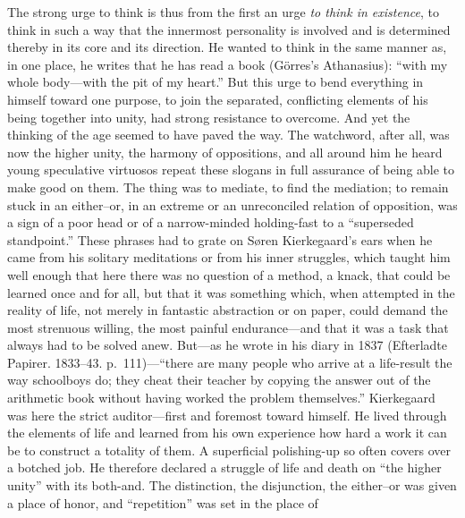 \documentclass[12pt,a4paper]{book}
\newcommand{\opage}[1]{\marginnote{\footnotesize\textit{[#1]}}}
\begin{document}
The strong urge to think is thus from the first an urge \textit{to think
in existence}, to think in such a way that the innermost personality is
involved and is determined thereby in its core and its direction. He
wanted to think in the same manner as, in one place, he writes that he
has read a book (Görres's Athanasius): ``with my whole body---with the pit
of my heart.'' But this urge to bend everything in himself toward one
purpose, to join the separated, conflicting elements of his being
together into unity, had strong resistance to overcome. And yet the
thinking of the age seemed to have paved the way. The watchword, after
all, was now the higher unity, the harmony of oppositions, and all around
him he heard young speculative virtuosos repeat these slogans in full
assurance of being able to make good on them. The thing was to mediate,
to find the mediation; to remain stuck in an either--or, in an extreme or
an unreconciled relation of opposition, was a sign of a poor head or of a
narrow-minded holding-fast to a ``superseded standpoint.'' These phrases
had to grate on Søren Kierkegaard's ears when he came from his solitary
meditations or from his inner struggles, which taught him well enough
that here there was no question of a method, a knack, that could be
learned once and for all, but that it was something which, when attempted
in the reality of life, not merely in fantastic
\opage{46}abstraction or on paper, could demand the most strenuous willing,
the most painful endurance---and that it was a task that always had to be
solved anew. But---as he wrote in his diary in 1837 (Efterladte Papirer.
1833--43. p.~111)---``there are many people who arrive at a life-result
the way schoolboys do; they cheat their teacher by copying the answer out
of the arithmetic book without having worked the problem themselves.''
Kierkegaard was here the strict auditor---first and foremost toward
himself. He lived through the elements of life and learned from his own
experience how hard a work it can be to construct a totality of them. A
superficial polishing-up so often covers over a botched job. He
therefore declared a struggle of life and death on ``the higher unity''
with its both-and. The distinction, the disjunction, the either--or was
given a place of honor, and ``repetition'' was set in the place of
\end{document}
